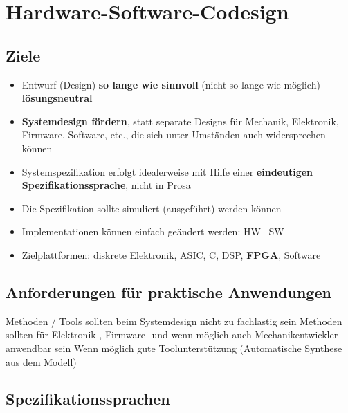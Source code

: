 \section{Hardware-Software-Codesign}

\subsection{Ziele}

\begin{itemize}
    \item Entwurf (Design) \textbf{so lange wie sinnvoll} (nicht so lange wie möglich) \textbf{lösungsneutral}
    \item \textbf{Systemdesign fördern}, statt separate Designs für Mechanik, Elektronik, Firmware, Software, etc., die sich
        unter Umständen auch widersprechen können
    \item Systemspezifikation erfolgt idealerweise mit Hilfe einer \textbf{eindeutigen Spezifikationssprache}, nicht in
        Prosa
    \item Die Spezifikation sollte simuliert (ausgeführt) werden können
    \item Implementationen können einfach geändert werden: HW \textlrarrow\ SW
    \item Zielplattformen: diskrete Elektronik, ASIC, \micro C, DSP, \textbf{FPGA}, Software
\end{itemize}


\subsection{Anforderungen für praktische Anwendungen}

\begin{outline}
    \1 Methoden / Tools sollten beim Systemdesign nicht zu fachlastig sein
        \2 Methoden sollten für Elektronik-, Firmware- und wenn möglich auch Mechanikentwickler anwendbar sein
    \1 Wenn möglich gute Toolunterstützung
    \1 (Automatische Synthese aus dem Modell)
\end{outline}


\subsection{Spezifikationssprachen}

